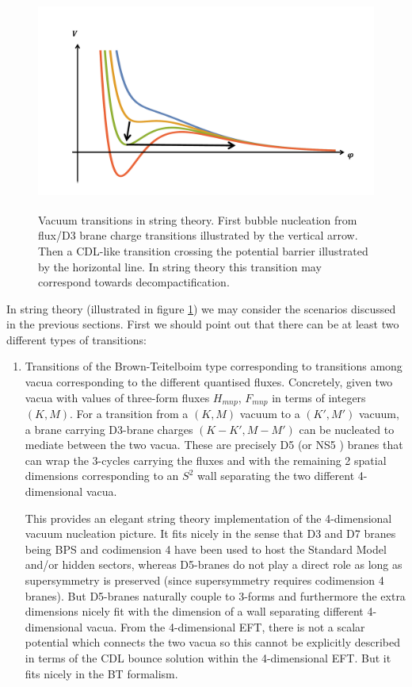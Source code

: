\begin{itemize}
\begin{figure}[t]
\begin{center}
\includegraphics[width=120mm,height=72mm]{Sections/Figures/VacuumTransition0.pdf} 
\caption{Vacuum transitions in string theory. First bubble nucleation from flux/D3 brane charge transitions illustrated by the vertical arrow. Then a CDL-like transition crossing the potential barrier illustrated by the horizontal line. In string theory this transition may correspond towards decompactification.} \label{Fig:BN2} 
\end{center}
\end{figure}
In string theory (illustrated in figure \ref{Fig:BN2}) we may consider the scenarios discussed in the previous sections. First we should point out that there can be at least two different types of transitions:
\begin{enumerate}
\item
Transitions of the Brown-Teitelboim type corresponding to transitions among vacua corresponding to the different quantised fluxes. Concretely, given two vacua with values of three-form fluxes 
$H_{mnp}$, $F_{mnp}$ in terms of integers $(K,M)$. For a transition from a $(K,M)$ vacuum to a $(K',M')$ vacuum, a brane carrying D3-brane charges $(K-K',M-M')$ can be nucleated to mediate between the two vacua. These are precisely D5 (or NS5 ) branes that can wrap the 3-cycles carrying the fluxes and with the remaining 2 spatial dimensions corresponding to an $S^2$ wall separating the two different 4-dimensional vacua.  

This provides an elegant string theory implementation of the 4-dimensional vacuum nucleation picture. It fits nicely in the sense that D3 and D7 branes being BPS and codimension 4 have been used to host the Standard Model and/or hidden sectors, whereas D5-branes do not play a direct role as long as supersymmetry is preserved (since supersymmetry requires codimension 4 branes). But D5-branes naturally couple to 3-forms and furthermore the extra dimensions nicely fit with the dimension of a wall separating different 4-dimensional vacua. From the 4-dimensional EFT, there is not a scalar potential which connects the two vacua so this cannot be explicitly described in terms of the CDL bounce solution within the 4-dimensional EFT. But it fits nicely in the BT formalism.


\end{enumerate}
\end{itemize}
